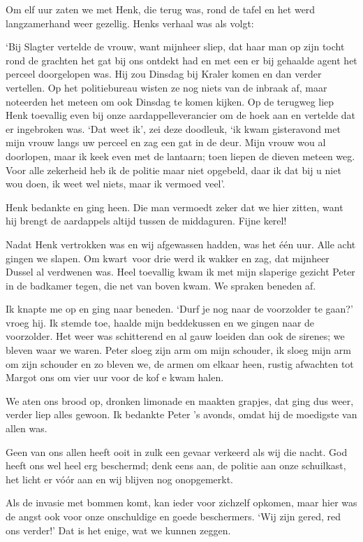 \documentclass{book}
\begin{document}
Om elf uur zaten we met Henk, die terug was, rond de tafel en het werd
langzamerhand weer gezellig. Henks verhaal was als volgt:

`Bij Slagter vertelde de vrouw, want mijnheer sliep, dat haar man op zijn tocht
rond de grachten het gat bij ons ontdekt had en met een er bij gehaalde agent
het perceel doorgelopen was. Hij zou Dinsdag bij Kraler komen en dan verder
vertellen. Op het politiebureau wisten ze nog niets van de inbraak af, maar
noteerden het meteen om ook Dinsdag te komen kijken. Op de terugweg liep Henk
toevallig even bij onze aardappelleverancier om de hoek aan en vertelde dat er
ingebroken was.  `Dat weet ik', zei deze doodleuk, `ik kwam gisteravond met mijn
vrouw langs uw perceel en zag een gat in de deur. Mijn vrouw wou al doorlopen,
maar ik keek even met de lantaarn; toen liepen de dieven meteen weg.  Voor alle
zekerheid heb ik de politie maar niet opgebeld, daar ik dat bij u niet wou doen,
ik weet wel niets, maar ik vermoed veel'.

Henk bedankte en ging heen. Die man vermoedt zeker dat we hier zitten, want hij
brengt de aardappels altijd tussen de middaguren. Fijne kerel!

Nadat Henk vertrokken was en wij afgewassen hadden, was het één uur.  Alle acht
gingen we slapen. Om kwart~voor drie werd ik wakker en zag, dat mijnheer Dussel
al verdwenen was. Heel toevallig kwam ik met mijn slaperige gezicht Peter in de
badkamer tegen, die net van boven kwam. We spraken beneden af.

Ik knapte me op en ging naar beneden. `Durf je nog naar de voorzolder te gaan?'
vroeg hij. Ik stemde toe, haalde mijn beddekussen en we gingen naar de
voorzolder. Het weer was schitterend en al gauw loeiden dan ook de sirenes; we
bleven waar we waren. Peter sloeg zijn arm om mijn schouder, ik sloeg mijn arm
om zijn schouder en zo bleven we, de armen om elkaar heen, rustig afwachten tot
Margot ons om vier uur voor de kof e kwam halen.

We aten ons brood op, dronken limonade en maakten grapjes, dat ging dus weer,
verder liep alles gewoon. Ik bedankte Peter 's avonds, omdat hij de moedigste
van allen was.

Geen van ons allen heeft ooit in zulk een gevaar verkeerd als wij die nacht. God
heeft ons wel heel erg beschermd; denk eens aan, de politie aan onze schuilkast,
het licht er vóór aan en wij blijven nog onopgemerkt.

Als de invasie met bommen komt, kan ieder voor zichzelf opkomen, maar hier was
de angst ook voor onze onschuldige en goede beschermers. `Wij zijn gered, red
ons verder!' Dat is het enige, wat we kunnen zeggen.
\end{document}

